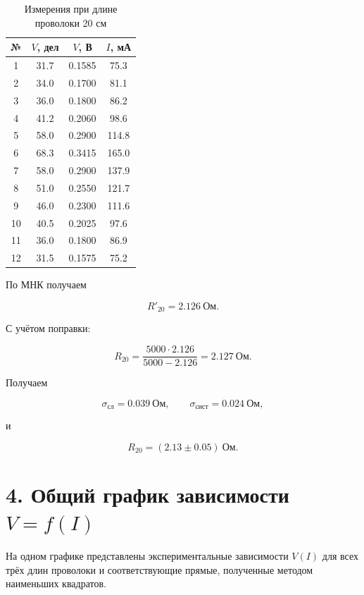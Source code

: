 \documentclass[12pt,a4paper]{article}
\begin{document}
\begin{table}[H]
\centering
\caption{Измерения при длине проволоки 20 см}
\begin{tabular}{c|c|c|c}
\toprule
№ & $V$, дел & $V$, В & $I$, мА\\
\midrule
1&31.7&0.1585&75.3\\
2&34.0&0.1700&81.1\\
3&36.0&0.1800&86.2\\
4&41.2&0.2060&98.6\\
5&58.0&0.2900&114.8\\
6&68.3&0.3415&165.0\\
7&58.0&0.2900&137.9\\
8&51.0&0.2550&121.7\\
9&46.0&0.2300&111.6\\
10&40.5&0.2025&97.6\\
11&36.0&0.1800&86.9\\
12&31.5&0.1575&75.2\\
\bottomrule
\end{tabular}
\end{table}

По МНК получаем

\begin{equation}
R'_{20}=2.126\ \text{Ом}.
\end{equation}

С учётом поправки:

\begin{equation}
R_{20}
=
\frac{5000\cdot2.126}{5000-2.126}
=
2.127\ \text{Ом}.
\end{equation}

Получаем

\begin{equation}
\sigma_{\text{сл}}
=
0.039\ \text{Ом},
\qquad
\sigma_{\text{сист}}
=
0.024\ \text{Ом},
\end{equation}

и

\begin{equation}
\boxed{
R_{20}=(2.13\pm0.05)\ \text{Ом}
}.
\end{equation}


\section*{4. Общий график зависимости $V=f(I)$}

На одном графике представлены экспериментальные зависимости
$V(I)$ для всех трёх длин проволоки и соответствующие прямые,
полученные методом наименьших квадратов.
\end{document}
